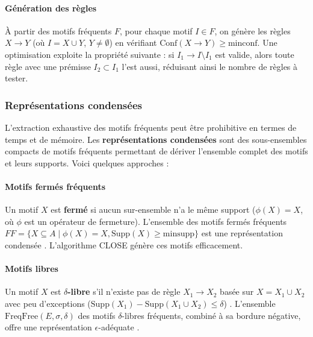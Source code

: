 \documentclass[a4paper,12pt]{report}
\begin{document}
        \paragraph{Génération des règles}
        
        À partir des motifs fréquents \( F \), pour chaque motif \( I \in F \), on génère les règles \( X \rightarrow Y \) (où \( I = X \cup Y \), \( Y \neq \emptyset \)) en vérifiant \( \text{Conf}(X \rightarrow Y) \geq \text{minconf} \). Une optimisation \cite{AS94} exploite la propriété suivante : si \( I_1 \rightarrow I \setminus I_1 \) est valide, alors toute règle avec une prémisse \( I_2 \subset I_1 \) l’est aussi, réduisant ainsi le nombre de règles à tester.
        
        \subsubsection{Représentations condensées}
        \label{sec:rep_condensees}
        
        L’extraction exhaustive des motifs fréquents peut être prohibitive en termes de temps et de mémoire. Les \textbf{représentations condensées} sont des sous-ensembles compacts de motifs fréquents permettant de dériver l’ensemble complet des motifs et leurs supports. Voici quelques approches :
        
        \paragraph{Motifs fermés fréquents}
        
        Un motif \( X \) est \textbf{fermé} si aucun sur-ensemble n’a le même support (\( \phi(X) = X \), où \( \phi \) est un opérateur de fermeture). L’ensemble des motifs fermés fréquents \( FF = \{X \subseteq A \mid \phi(X) = X, \text{Supp}(X) \geq \text{minsupp}\} \) est une représentation condensée \cite{PBTL99a}. L’algorithme CLOSE génère ces motifs efficacement.
        
        \paragraph{Motifs libres}
        
        Un motif \( X \) est \textbf{\( \delta \)-libre} s’il n’existe pas de règle \( X_1 \rightarrow X_2 \) basée sur \( X = X_1 \cup X_2 \) avec peu d’exceptions (\( \text{Supp}(X_1) - \text{Supp}(X_1 \cup X_2) \leq \delta \)) \cite{BB00}. L’ensemble \( \text{FreqFree}(E, \sigma, \delta) \) des motifs \( \delta \)-libres fréquents, combiné à sa bordure négative, offre une représentation \( \epsilon \)-adéquate \cite{BBR03}.
        
\end{document}
